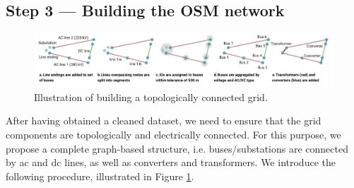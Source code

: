 \documentclass[fleqn,10pt]{wlscirep}
\begin{document}
\subsection*{Step 3 --- Building the OSM network}
\begin{figure}[!htbp]
    \centering
    \includegraphics[width=\linewidth]{figures/fig_build_osm_network.pdf}
    \caption{Illustration of building a topologically connected grid.}
    \label{fig:build_osm_network}
\end{figure}

After having obtained a cleaned dataset, we need to ensure that the grid components are topologically and electrically connected. For this purpose, we propose a complete graph-based structure, i.e. buses/substations are connected by \acrshort{ac} and \acrshort{dc} lines, as well as converters and transformers. We introduce the following procedure, illustrated in Figure \ref{fig:build_osm_network}.
\end{document}
